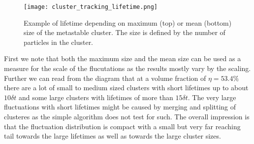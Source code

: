 \begin{figure}[h]
\centering
\texttt{[image: cluster\_tracking\_lifetime.png]}
\caption[Example for correlation between a unstable cluster's size and lifetime]{Example of lifetime depending on  maximum (top) or mean (bottom) size of the metastable cluster. The size is defined by the number of particles in the cluster.}
\label{fig:lifetime}
\end{figure}
First we note that both the maximum size and the mean size can be used as a measure for the scale of the flucutations as the results mostly vary by the scaling. Further we can read from the diagram that at a volume fraction of $\eta = 53.4\%$ there are a lot of small to medium sized clusters with short lifetimes up to about $10 \delta t$ and some large clusters with lifetimes of more than $15 \delta t$. The very large fluctuations with short lifetimes might be caused by merging and splitting of clusteres as the simple algorithm does not test for such. The overall impression is that the fluctuation distribution is compact with a small but very far reaching tail towards the large lifetimes as well as towards the large cluster sizes.





